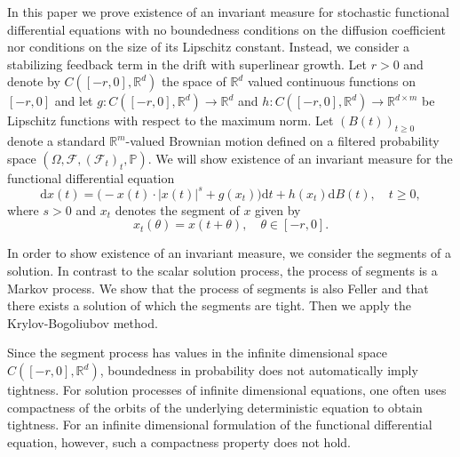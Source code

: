 \documentclass[11pt,reqno,draft]{amsart}
\begin{document}
\noindent In this paper we prove existence of an invariant measure
for stochastic functional differential equations with no boundedness
conditions on the diffusion coefficient nor conditions on the size
of its Lipschitz constant. Instead, we consider a stabilizing
feedback term in the drift with superlinear growth. Let $r>0$ and
denote by  $C([-r,0],\mathbb{R}^d)$ the space of $\mathbb{R}^d$ valued
continuous functions on $[-r,0]$ and let $g\colon
C([-r,0],{\mathbb R}^d)\to\mathbb{R}^d$ and $h\colon
C([-r,0],{\mathbb R}^{d}) \to \mathbb{R}^{d\times m}$ be Lipschitz functions with respect
to the maximum norm. Let
$(B(t))_{t\ge 0}$ denote a standard ${\mathbb R}^m$-valued Brownian motion
defined on a filtered probability space
$(\Omega,\mathcal{F},(\mathcal{F}_t)_t,\mathbb{P})$. We will show
existence of an invariant measure for the functional differential
equation
\begin{equation}\label{sdde00} \mathrm{d}x(t)=\Big( -x(t)\cdot|x(t)|^s +g(x_t)\Big)\mathrm{d}t + h(x_t)\mathrm{d}B(t),\quad t\ge 0,\end{equation}
where $s>0$ and $x_t$ denotes the segment of $x$ given by
\[x_t(\theta)=x(t+\theta),\quad \theta\in [-r,0].\]

\noindent In order to show existence of an invariant measure, we
consider the segments of a solution. In contrast to the scalar
solution process, the process of segments is a Markov process. We
show that the process of segments is also Feller and that there
exists a solution of which the segments are tight. Then we apply the
Krylov-Bogoliubov method.

\noindent Since the segment process has values in the infinite
dimensional space $C([-r,0],{\mathbb R}^d)$, boundedness in probability does
not automatically imply tightness. For solution processes of
infinite dimensional equations, one often uses compactness of the
orbits of the underlying deterministic equation to obtain tightness.
For an infinite dimensional formulation of the functional
differential equation, however, such a compactness property does not
hold.
\end{document}
